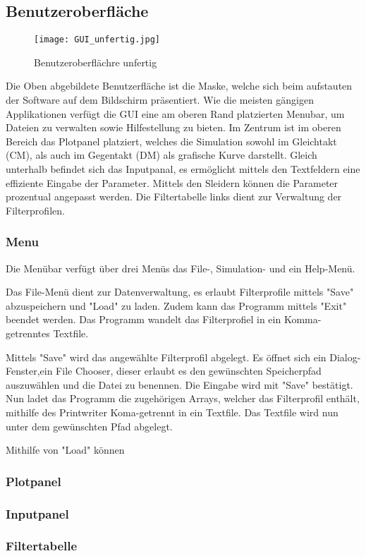 \subsection{Benutzeroberfläche} \label{subsec:benutzeroberflaeche}

\begin{figure}[H]
		\centering
		\texttt{[image: GUI\_unfertig.jpg]}
		\label{fig:gui}
		\caption{Benutzeroberflächre unfertig}
\end{figure}

Die Oben abgebildete Benutzerfläche ist die Maske, welche sich beim aufstauten der Software auf dem Bildschirm präsentiert.
Wie die  meisten gängigen Applikationen verfügt die GUI eine am oberen Rand platzierten Menubar, um Dateien zu verwalten sowie Hilfestellung zu bieten.
Im Zentrum ist im oberen Bereich das Plotpanel platziert, welches die Simulation sowohl im Gleichtakt (CM), als auch im Gegentakt (DM) als grafische Kurve darstellt.
Gleich unterhalb befindet sich das Inputpanal, es ermöglicht mittels den Textfeldern eine  effiziente Eingabe der Parameter. Mittels den Sleidern können die Parameter prozentual angepasst werden.
Die Filtertabelle links dient zur Verwaltung der Filterprofilen.


\subsubsection{Menu}\label{subsubsec:menu}

Die Menübar verfügt über drei Menüs das File-,  Simulation- und ein Help-Menü.

Das File-Menü dient zur Datenverwaltung, es erlaubt Filterprofile mittels "Save" abzuspeichern und "Load" zu laden. Zudem kann das Programm mittels "Exit" beendet  werden.
Das Programm wandelt das Filterprofiel in ein Komma-getrenntes Textfile.

Mittels "Save" wird das angewählte Filterprofil abgelegt. Es öffnet sich ein Dialog-Fenster,ein File Chooser, dieser erlaubt es den gewünschten Speicherpfad auszuwählen und die Datei zu benennen. Die Eingabe wird mit "Save" bestätigt. Nun ladet das Programm die zugehörigen Arrays, welcher das Filterprofil enthält, mithilfe des Printwriter Koma-getrennt in ein Textfile. Das Textfile wird nun unter dem gewünschten Pfad abgelegt.

Mithilfe von "Load" können





\subsubsection{Plotpanel} \label{subsubsec:plotpanel}


\subsubsection{Inputpanel} \label{subsubsec:inputpanel}



\subsubsection{Filtertabelle} \label{subsubsec:filtertabelle}

